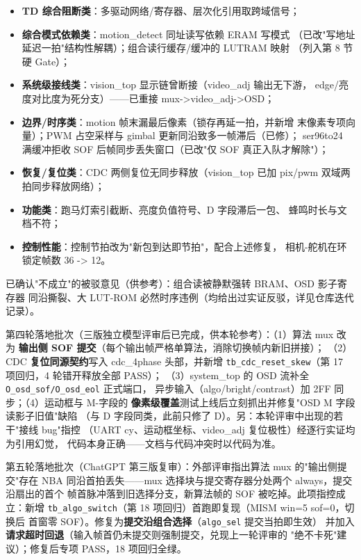 \documentclass[10pt]{ctexart}
\newcommand{\code}[1]{\texttt{#1}}
\begin{document}
\begin{itemize}
  \item \textbf{TD 综合阻断类}：多驱动网络/寄存器、层次化引用取跨域信号；
  \item \textbf{综合模式依赖类}：motion\_detect 同址读写依赖 ERAM 写模式
        （已改"写地址延迟一拍"结构性解耦）；组合读行缓存/缓冲的 LUTRAM 映射
        （列入第 8 节硬 Gate）；
  \item \textbf{系统级接线类}：vision\_top 显示链曾断接（video\_adj 输出无下游，
        edge/亮度对比度为死分支）——已重接 mux->video\_adj->OSD；
  \item \textbf{边界/时序类}：motion 帧末漏最后像素（锁存再延一拍，并新增
        末像素专项向量）；PWM 占空采样与 gimbal 更新同沿致多一帧滞后（已修）；
        ser96to24 满缓冲拒收 SOF 后帧同步丢失窗口（已改"仅 SOF 真正入队才解除"）；
  \item \textbf{恢复/复位类}：CDC 两侧复位无同步释放（vision\_top 已加 pix/pwm
        双域两拍同步释放网络）；
  \item \textbf{功能类}：跑马灯索引截断、亮度负值符号、D 字段滞后一包、
        蜂鸣时长与文档不符；
  \item \textbf{控制性能}：控制节拍改为"新包到达即节拍"，配合上述修复，
        相机-舵机在环锁定帧数 36 -> 12。
\end{itemize}

已确认"不成立"的被驳意见（供参考）：组合读被静默强转 BRAM、OSD 影子寄存器
同沿撕裂、大 LUT-ROM 必然时序违例（均给出过实证反驳，详见仓库迭代记录）。

第四轮落地批次（三版独立模型评审后已完成，供本轮参考）：（1）算法 mux 改为
\textbf{输出侧 SOF 提交}（每个输出帧严格单算法，消除切换帧内新旧拼接）；
（2）CDC \textbf{复位同源契约}写入 cdc\_4phase 头部，并新增
\code{tb\_cdc\_reset\_skew}（第 17 项回归，4 轮错开释放全部 PASS）；
（3）system\_top 的 OSD 流补全 \code{O\_osd\_sof/O\_osd\_eol} 正式端口，
异步输入（algo/bright/contrast）加 2FF 同步；（4）运动框与 M-字段的
\textbf{像素级覆盖}测试上线后立刻抓出并修复"OSD M 字段读影子旧值"缺陷
（与 D 字段同类，此前只修了 D）。另：本轮评审中出现的若干"接线 bug"指控
（UART cy、运动框坐标、video\_adj 复位极性）经逐行实证均为引用幻觉，
代码本身正确——文档与代码冲突时以代码为准。

第五轮落地批次（ChatGPT 第三版复审）：外部评审指出算法 mux 的"输出侧提交"存在
NBA 同沿首拍丢失——mux 选择块与提交寄存器分处两个 always，提交沿扇出的首个
帧首脉冲落到旧选择分支，新算法帧的 SOF 被吃掉。此项指控成立：新增
\code{tb\_algo\_switch}（第 18 项回归）首跑即复现（MISM win=5 sof=0，切换后
首窗零 SOF）。修复为\textbf{提交沿组合选择}（\code{algo\_sel} 提交当拍即生效）
并加入\textbf{请求超时回退}（输入帧首仍未提交则强制提交，兑现上一轮评审的
"绝不卡死"建议）；修复后专项 PASS，18 项回归全绿。
\end{document}
